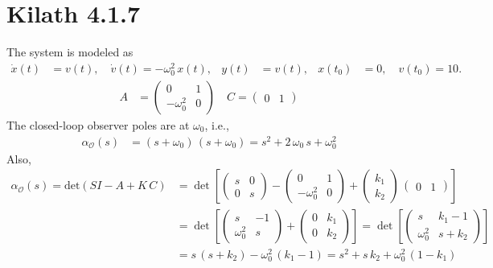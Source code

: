 \section{Kilath 4.1.7}
The system is modeled as 
\begin{align*}
    \dot x(t) &= v(t), \quad \dot v(t) = -\omega_0^2\,x(t), & y(t)&= v(t), & x(t_0) &= 0, \quad v(t_0) = 10.
\end{align*}
\begin{align*}
    A &= \begin{pmatrix}
        0 & 1 \\ -\omega_0^2 & 0
    \end{pmatrix} \quad C = \begin{pmatrix}
        0 & 1
    \end{pmatrix}
\end{align*}
The closed-loop observer poles are at $\omega_0$, i.e., 
\begin{align*}
    \alpha_\mathcal{O}(s) &= \left(s + \omega_0\right)\,\left(s + \omega_0\right) = s^2 + 2\,\omega_0\,s + \omega_0^2
\end{align*}
Also, 
\begin{align*}
    \alpha_\mathcal{O}(s) = \text{det}\left(SI - A + K\,C\right) &= \det\left[\begin{pmatrix}
        s & 0 \\ 0 & s
    \end{pmatrix} - \begin{pmatrix}
        0 & 1 \\ -\omega_0^2 & 0
    \end{pmatrix} + \begin{pmatrix}
        k_1 \\ k_2
    \end{pmatrix}\,\begin{pmatrix}
        0 & 1
    \end{pmatrix}\right] \\
    &= \det\left[\begin{pmatrix}
        s & -1 \\ \omega_0^2 & s
    \end{pmatrix} + \begin{pmatrix}
        0 & k_1 \\ 0 & k_2
    \end{pmatrix}\right] = \det\left[\begin{pmatrix}
        s & k_1-1 \\ \omega_0^2 & s + k_2
    \end{pmatrix}\right] \\
    &= s\,\left(s + k_2\right) - \omega_0^2\,\left(k_1 - 1\right) = s^2 + s\,k_2 + \omega_0^2\,\left(1 - k_1\right)
\end{align*}
